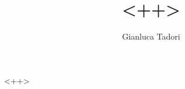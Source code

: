 \documentclass{article}
\author{Gianluca Tadori}
\title{<++>}
\begin{document}
\maketitle

<++>
\printbibliography
\end{document}
